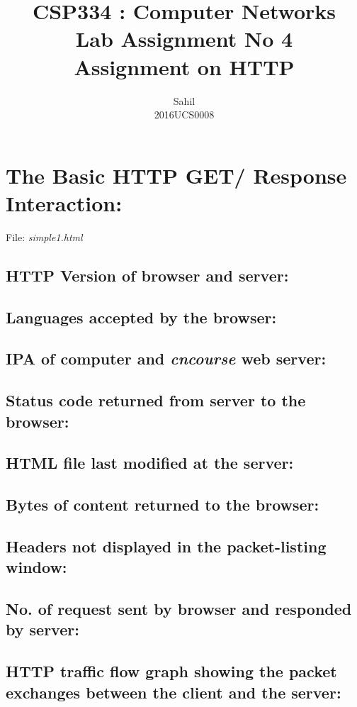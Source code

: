\documentclass[]{report}
\title{\centering CSP334 : Computer Networks \\Lab Assignment No 4\\Assignment on HTTP}
\author{\LARGE Sahil\\2016UCS0008}
\begin{document}
\maketitle

\section{The Basic HTTP GET/ Response Interaction:}
File: \textit{simple1.html}
\subsection{HTTP Version of browser and server:}

\subsection{Languages accepted by the browser:}

\subsection{IPA of computer and \textit{cncourse} web server:}

\subsection{Status code returned from server to the browser:}

\subsection{HTML file last modified at the server:}

\subsection{Bytes of content returned to the browser:}

\subsection{Headers not displayed in the packet-listing window:}

\subsection{No. of request sent by browser and responded by server:}

\subsection{HTTP traffic flow graph showing the packet exchanges between the client and the server:}
\end{document}
